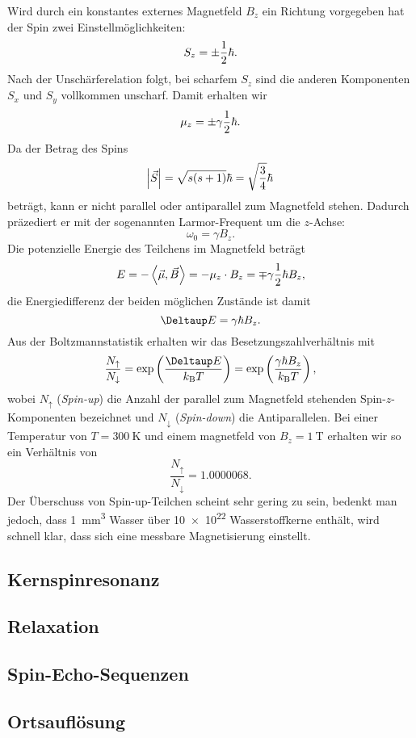 \documentclass[
    11pt,
    ngerman
]{scrreprt}
\begin{document}
Wird durch ein konstantes externes Magnetfeld $B_z$ ein Richtung vorgegeben hat
der Spin zwei Einstellmöglichkeiten:
\[
    S_z = \pm\frac 12\hbar.
\]
Nach der Unschärferelation folgt, bei scharfem $S_z$ sind die anderen
Komponenten $S_x$ und $S_y$ vollkommen unscharf. Damit erhalten wir
\[
    \mu_z = \pm\gamma\frac 12\hbar.
\]
Da der Betrag des Spins 
\[
    \abs{\vec S} = \sqrt{s(s+1)}\hbar = \sqrt{\frac34}\hbar
\]
beträgt, kann er nicht parallel oder antiparallel zum Magnetfeld stehen.
Dadurch präzediert er mit der sogenannten Larmor-Frequent um die $z$-Achse:
\[
    \omega_0 = \gamma B_z.
\]
Die potenzielle Energie des Teilchens im Magnetfeld beträgt
\[
    E = -\left\langle\vec\mu,\vec B\right\rangle = -\mu_z \cdot B_z = \mp\gamma\frac 12\hbar B_z,
\]
die Energiedifferenz der beiden möglichen Zustände ist damit
\[
    \Deltaup E = \gamma\hbar B_z.
\]
Aus der Boltzmannstatistik erhalten wir das Besetzungszahlverhältnis mit
\[
    \frac{N_\uparrow}{N_\downarrow} = \dexp{\frac{\Deltaup E}{k_\text{B}T}} =
    \dexp{\frac{\gamma\hbar B_z}{k_\text{B}T}},
\]
wobei $N_\uparrow$ (\emph{Spin-up}) die Anzahl der parallel zum Magnetfeld
stehenden Spin-$z$-Komponenten bezeichnet und $N_\downarrow$ (\emph{Spin-down})
die Antiparallelen. Bei einer Temperatur von $T = \SI{300}{\kelvin}$ und einem
magnetfeld von $B_z = \SI{1}{\tesla}$ erhalten wir so ein Verhältnis von
\[
    \frac{N_\uparrow}{N_\downarrow} = \num{1.0000068}.
\]
Der Überschuss von Spin-up-Teilchen scheint sehr gering zu sein, bedenkt man
jedoch, dass \SI{1}{\milli\meter\cubed} Wasser über \num{10e22} Wasserstoffkerne
enthält, wird schnell klar, dass sich eine messbare Magnetisierung einstellt.

\subsection{Kernspinresonanz}

\subsection{Relaxation}

\subsection{Spin-Echo-Sequenzen}

\subsection{Ortsauflösung}
\end{document}
